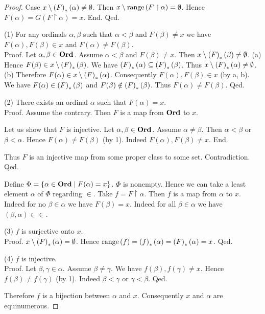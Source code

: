 \documentclass{article}
\begin{document}
\begin{forthel}
\begin{proof}
        Case $x \setminus \left(F\right)_{*}(\alpha) \neq \emptyset$.
          Then $x \setminus \mathrm{range}\left(F \restriction \alpha\right) = \emptyset$.
          Hence $F(\alpha)
            = G(F \restriction \alpha)
            = x$.
        End.
      Qed.

      (1) For any ordinals $\alpha, \beta$ such that $\alpha \less \beta$ and
      $F(\beta) \neq x$ we have $F(\alpha), F(\beta) \in x$ and $F(\alpha) \neq
      F(\beta)$. \\
      Proof.
        Let $\alpha, \beta \in \mathbf{Ord}$.
        Assume $\alpha \less \beta$ and $F(\beta) \neq x$.
        Then $x \setminus \left(F\right)_{*}(\beta) \neq \emptyset$.
        (a) Hence $F(\beta) \in x \setminus \left(F\right)_{*}(\beta)$.
        We have $\left(F\right)_{*}(\alpha) \subseteq \left(F\right)_{*}(\beta)$.
        Thus $x \setminus \left(F\right)_{*}(\alpha) \neq \emptyset$.
        (b) Therefore $F(\alpha) \in x \setminus \left(F\right)_{*}(\alpha)$.
        Consequently $F(\alpha), F(\beta) \in x$ (by a, b).
        We have $F(\alpha) \in \left(F\right)_{*}(\beta)$ and $F(\beta) \notin \left(F\right)_{*}(\beta)$.
        Thus $F(\alpha) \neq F(\beta)$.
      Qed.

      (2) There exists an ordinal $\alpha$ such that $F(\alpha) = x$. \\
      Proof.
        Assume the contrary.
        Then $F$ is a map from $\mathbf{Ord}$ to $x$.

        Let us show that $F$ is injective.
          Let $\alpha, \beta \in \mathbf{Ord}$.
          Assume $\alpha \neq \beta$.
          Then $\alpha \less \beta$ or $\beta \less \alpha$.
          Hence $F(\alpha) \neq F(\beta)$ (by 1).
          Indeed $F(\alpha), F(\beta) \neq x$.
        End.

        Thus $F$ is an injective map from some proper class to some set.
        Contradiction.
      Qed.

      Define $\Phi = \{ \alpha \in \mathbf{Ord} \mid F(\alpha) = x \}$.
      $\Phi$ is nonempty.
      Hence we can take a least element $\alpha$ of $\Phi$ regarding ${\in}$.
      Take $f = F \restriction \alpha$.
      Then $f$ is a map from $\alpha$ to $x$.
      Indeed for no $\beta \in \alpha$ we have $F(\beta) = x$.
      Indeed for all $\beta \in \alpha$ we have $(\beta, \alpha) \in {\in}$.

      (3) $f$ is surjective onto $x$. \\
      Proof.
        $x \setminus \left(F\right)_{*}(\alpha) = \emptyset$.
        Hence $\mathrm{range}\left(f\right)
          = \left(f\right)_{*}(\alpha)
          = \left(F\right)_{*}(\alpha)
          = x$.
      Qed.

      (4) $f$ is injective. \\
      Proof.
        Let $\beta, \gamma \in \alpha$.
        Assume $\beta \neq \gamma$.
        We have $f(\beta), f(\gamma) \neq x$.
        Hence $f(\beta) \neq f(\gamma)$ (by 1).
        Indeed $\beta \less \gamma$ or $\gamma \less \beta$.
      Qed.

      Therefore $f$ is a bijection between $\alpha$ and $x$.
      Consequently $x$ and $\alpha$ are equinumerous.
    \end{proof}
  \end{forthel}

  \printbibliography
\end{document}
